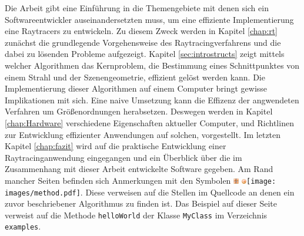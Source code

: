 Die Arbeit gibt eine Einführung in die Themengebiete mit denen sich ein Softwareentwickler auseinandersetzten muss, um eine effiziente Implementierung eine Raytracers zu entwickeln. Zu diesem Zweck werden in Kapitel \ref{chap:rt} zunächst die grundlegende Vorgehensweise des Raytracingverfahrens und die dabei zu lösenden Probleme aufgezeigt.
Kapitel \ref{sec:introstructs} zeigt mittels welcher Algorithmen das Kernproblem, die Bestimmung eines Schnittpunktes von einem Strahl und der Szenengeometrie, effizient gelöst werden kann.
Die Implementierung dieser Algorithmen auf einem Computer bringt gewisse Implikationen mit sich. Eine naive Umsetzung kann die Effizenz der angwendeten Verfahren um Größenordnungen herabsetzen. Deswegen werden in Kapitel \ref{chap:Hardware} verschiedene Eigenschaften aktueller Computer, und Richtlinen zur Entwicklung effizienter Anwendungen auf solchen, vorgestellt.
Im letzten Kapitel \ref{chap:fazit} wird auf die praktische Entwicklung einer Raytracinganwendung eingegangen und ein Überblick über die im Zusammenhang mit dieser Arbeit entwickelte Software gegeben.
Am Rand mancher Seiten befinden sich Anmerkungen mit den Symbolen \includegraphics[width=7pt]{images/package.pdf} \includegraphics[width=6pt]{images/class.pdf}\texttt{[image: images/method.pdf]}. Diese verweisen auf die Stellen im Quellcode an denen ein zuvor beschriebener Algorithmus zu finden ist. Das Beispiel auf dieser Seite verweist auf die Methode \verb|helloWorld| der Klasse \verb|MyClass| im Verzeichnis \verb|examples|.

